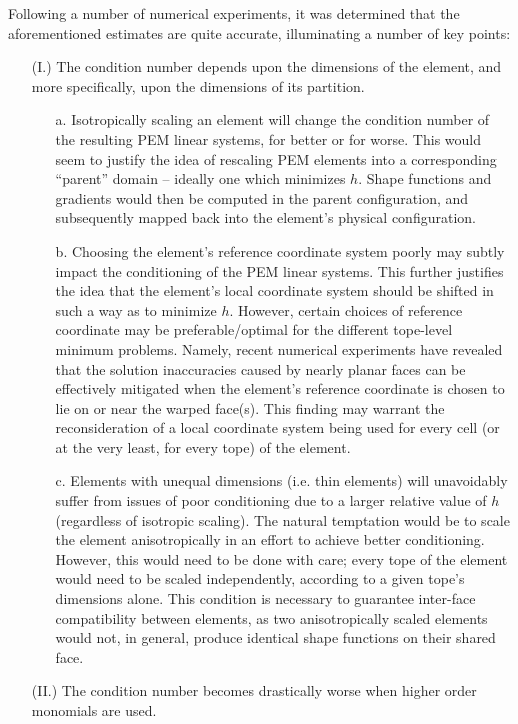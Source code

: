 Following a number of numerical experiments, it was determined that the aforementioned estimates are quite accurate, illuminating a number of key points:
\begin{itemize}
	\item[(I.)] The condition number depends upon the dimensions of the element, and more specifically, upon the dimensions of its partition.
	\begin{itemize}
		\item[a.] Isotropically scaling an element will change the condition number of the resulting PEM linear systems, for better or for worse. This would seem to justify the idea of rescaling PEM elements into a corresponding ``parent'' domain -- ideally one which minimizes $h$. Shape functions and gradients would then be computed in the parent configuration, and subsequently mapped back into the element's physical configuration.
		\item[b.] Choosing the element's reference coordinate system poorly may subtly impact the conditioning of the PEM linear systems. This further justifies the idea that the element's local coordinate system should be shifted in such a way as to minimize $h$. However, certain choices of reference coordinate may be preferable/optimal for the different tope-level minimum problems. Namely, recent numerical experiments have revealed that the solution inaccuracies caused by nearly planar faces can be effectively mitigated when the element's reference coordinate is chosen to lie on or near the warped face(s). This finding may warrant the reconsideration of a local coordinate system being used for every cell (or at the very least, for every tope) of the element.
		\item[c.] Elements with unequal dimensions (i.e. thin elements) will unavoidably suffer from issues of poor conditioning due to a larger relative value of $h$ (regardless of isotropic scaling). The natural temptation would be to scale the element anisotropically in an effort to achieve better conditioning. However, this would need to be done with care; every tope of the element would need to be scaled independently, according to a given tope's dimensions alone. This condition is necessary to guarantee inter-face compatibility between elements, as two anisotropically scaled elements would not, in general, produce identical shape functions on their shared face.
	\end{itemize}
	\item[(II.)] The condition number becomes drastically worse when higher order monomials are used.

\end{itemize}
